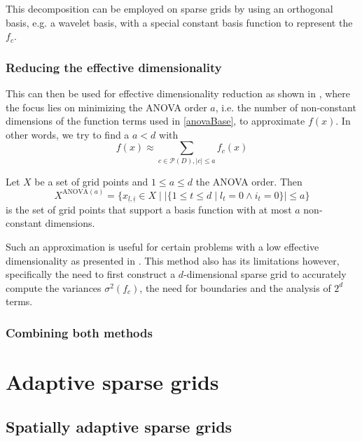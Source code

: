 \documentclass[
  a4paper,  %
  twoside,  %
  bibliography=totoc,
  headsepline,
  cleardoublepage=empty,
  parskip=half,
  draft=false
]{scrbook}
\begin{document}
This decomposition can be employed on sparse grids by using an orthogonal basis, e.g. a wavelet basis, with a special constant basis function to represent the $f_c$.

\newpage
\subsection{Reducing the effective dimensionality}

This can then be used for effective dimensionality reduction as shown in \cite{G13,F10}, where the focus lies on minimizing the ANOVA order $a$, i.e. the number of non-constant dimensions of the function terms used in \eqref{anovaBase}, to approximate $f(x)$.
In other words, we try to find a $a < d$ with
\begin{equation}
f(x) \approx \sum_{c \in \mathcal{P}(D), |c| \leq a} f_c(x)
\end{equation}

\begin{definition}
Let $X$ be a set of grid points and $1 \leq a \leq d$ the ANOVA order.
Then
\begin{equation}
X^{\text{ANOVA}(a)}=\{x_{\underline{l},\underline{i}} \in X \mid |\{1 \leq t \leq d \mid l_t=0 \land i_t = 0\}| \leq a\}
\end{equation}
is the set of grid points that support a basis function with at most $a$ non-constant dimensions.
\end{definition}

Such an approximation is useful for certain problems with a low effective dimensionality as presented in \cite{H08}.
This method also has its limitations however, specifically the need to first construct a $d$-dimensional sparse grid to accurately compute the variances $\sigma^2(f_c)$, the need for boundaries and the analysis of $2^d$ terms.


\subsection{Combining both methods}

\chapter{Adaptive sparse grids}


\section{Spatially adaptive sparse grids}
\end{document}
